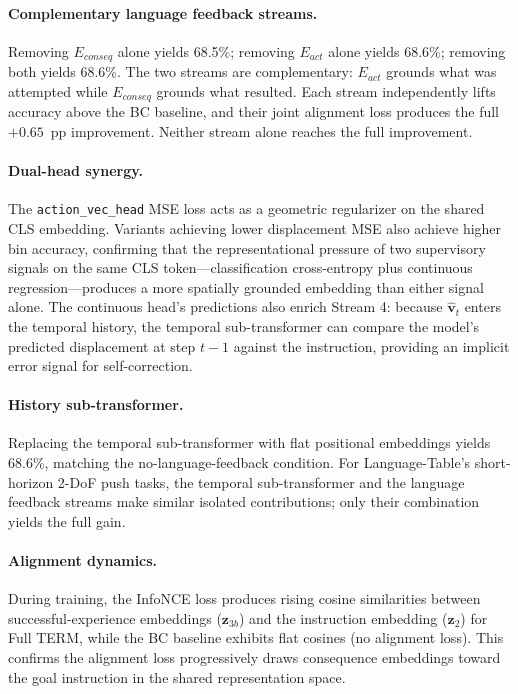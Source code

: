 \documentclass[letterpaper]{article} %
\begin{document}
\paragraph{Complementary language feedback streams.} Removing $E_{conseq}$ alone yields 68.5\%; removing $E_{act}$ alone yields 68.6\%; removing both yields 68.6\%. The two streams are complementary: $E_{act}$ grounds what was attempted while $E_{conseq}$ grounds what resulted. Each stream independently lifts accuracy above the BC baseline, and their joint alignment loss produces the full $+0.65$~pp improvement. Neither stream alone reaches the full improvement.

\paragraph{Dual-head synergy.} The \texttt{action\_vec\_head} MSE loss acts as a geometric regularizer on the shared CLS embedding. Variants achieving lower displacement MSE also achieve higher bin accuracy, confirming that the representational pressure of two supervisory signals on the same CLS token---classification cross-entropy plus continuous regression---produces a more spatially grounded embedding than either signal alone. The continuous head's predictions also enrich Stream 4: because $\hat{\mathbf{v}}_t$ enters the temporal history, the temporal sub-transformer can compare the model's predicted displacement at step $t{-}1$ against the instruction, providing an implicit error signal for self-correction.

\paragraph{History sub-transformer.} Replacing the temporal sub-transformer with flat positional embeddings yields 68.6\%, matching the no-language-feedback condition. For Language-Table's short-horizon 2-DoF push tasks, the temporal sub-transformer and the language feedback streams make similar isolated contributions; only their combination yields the full gain.

\paragraph{Alignment dynamics.} During training, the InfoNCE loss produces rising cosine similarities between successful-experience embeddings ($\mathbf{z}_{3b}$) and the instruction embedding ($\mathbf{z}_2$) for Full TERM, while the BC baseline exhibits flat cosines (no alignment loss). This confirms the alignment loss progressively draws consequence embeddings toward the goal instruction in the shared representation space.
\end{document}
